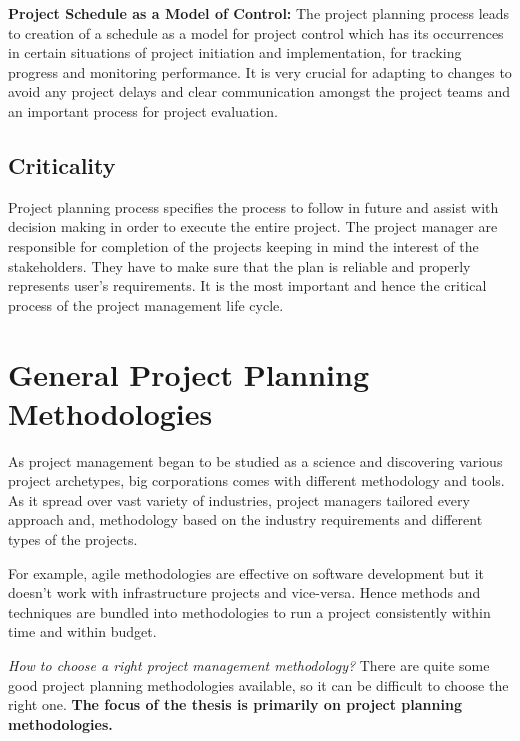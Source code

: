  \textbf{Project Schedule as a Model of Control:} The project planning \cite{Zwikael} process leads to creation of a schedule as a model for project control which has its occurrences in certain situations of project initiation and implementation, for tracking progress and monitoring performance. It is very crucial for adapting to changes to avoid any project delays and clear communication amongst the project teams and an important process for project evaluation.
 

 \subsection{Criticality}
 
 Project planning \cite{resourceconstraint} process specifies the process to follow in future and assist with decision making in order to execute the entire project. The project manager are responsible for completion of the projects keeping in mind the interest of the stakeholders. They have to make sure that the plan is reliable and properly represents user's requirements. It is the most important and hence the critical process of the project management life cycle.
 

\section{General Project Planning Methodologies}
 \label{sec:sec003}
 
 As project management began to be studied as a science and discovering various project archetypes, big corporations comes with different methodology and tools. As it spread over vast variety of industries, project managers tailored every approach and, methodology based on the industry requirements and different types of the projects.

For example, agile methodologies are effective on software development but it doesn’t work with infrastructure projects and vice-versa. Hence methods and techniques are bundled into methodologies to run a project consistently within time and within budget.

\emph{How to choose a right project management methodology?}
There are quite some good project planning methodologies available, so it can be difficult to choose the right one. \textbf{The focus of the thesis is primarily on project planning methodologies.}

